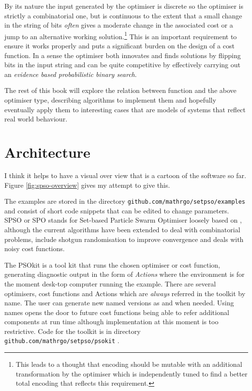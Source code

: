 \documentclass[a4paper,oneside,english]{book}
\numberwithin{equation}{section}
\numberwithin{figure}{section}
\newcommand{\codesorc}[1]{\texttt{github.com/mathrgo/setpso/#1}}
\begin{document}
	By its nature the input generated by the optimiser is discrete so the optimiser is strictly a combinatorial one, but is continuous to the extent that a small change in the string of bits \emph{often} gives a moderate change in the associated cost or a jump to an alternative working solution.\footnote{This leads to a thought that encoding should be mutable with an additional transformation by the optimiser which is independently tuned to find a better total encoding that reflects this requirement.} This is an important requirement to ensure it works properly and puts a significant burden on the design of a cost function. In a sense the optimiser both innovates and  finds solutions by flipping bits in the input string and can be quite competitive by effectively carrying out an \emph{evidence based probabilistic binary search}.   
	 
	 The rest of this book will explore the relation between function and the above optimiser type, describing algorithms to implement them and hopefully eventually apply them to interesting  cases that are models of systems that reflect real world behaviour. 
	 
	\section{Architecture}
	
	I think it helps to have a visual over view that is a cartoon of the software  so far. Figure \ref{fig:spso-overview} gives my attempt to give this. 
	
	The examples are stored in the directory \codesorc{examples} and consist of short code snippets that can be edited to change parameters. SPSO or SPO stands for Set-based Particle Swarm Optimiser loosely based on  \cite{KE-pso} , although the current algorithms have been extended to deal with combinatorial problems, include shotgun randomisation to improve convergence and deals with noisy cost functions. 
	
	The PSOkit is a tool kit that runs the chosen optimiser or cost function, generating diagnostic output in the form of \emph{Actions} where the environment is for the moment desk-top computer running the example. There are several optimisers,  cost functions and Actions which are \emph{always} referred in the toolkit by name. The user can generate new named versions as and when needed. Using names opens the door to future cost functions being able to refer additional components at run time although implementation at this moment is too restrictive. Code for the toolkit is in directory \codesorc{psokit} .
	
\end{document}
